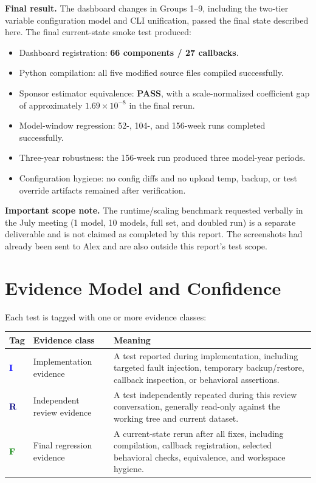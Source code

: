 \documentclass[11pt]{article}
\newcommand{\IR}{\textcolor{blue}{\textbf{I}}}
\newcommand{\RR}{\textcolor{navy}{\textbf{R}}}
\newcommand{\FR}{\textcolor{green}{\textbf{F}}}
\begin{document}
\textbf{Final result.} The dashboard changes in Groups 1--9, including the two-tier variable configuration model and CLI unification, passed the final state described here. The final current-state smoke test produced:

\begin{itemize}
  \item Dashboard registration: \textbf{66 components / 27 callbacks}.
  \item Python compilation: all five modified source files compiled successfully.
  \item Sponsor estimator equivalence: \textbf{PASS}, with a scale-normalized coefficient gap of approximately $1.69\times10^{-8}$ in the final rerun.
  \item Model-window regression: 52-, 104-, and 156-week runs completed successfully.
  \item Three-year robustness: the 156-week run produced three model-year periods.
  \item Configuration hygiene: no config diffs and no upload temp, backup, or test override artifacts remained after verification.
\end{itemize}

\textbf{Important scope note.} The runtime/scaling benchmark requested verbally in the July meeting (1 model, 10 models, full set, and doubled run) is a separate deliverable and is not claimed as completed by this report. The screenshots had already been sent to Alex and are also outside this report's test scope.

\section{Evidence Model and Confidence}

Each test is tagged with one or more evidence classes:

\begin{center}
\begin{tabular}{L{1.0cm}L{4.3cm}L{10.2cm}}
\toprule
\textbf{Tag} & \textbf{Evidence class} & \textbf{Meaning}\\
\midrule
\IR & Implementation evidence & A test reported during implementation, including targeted fault injection, temporary backup/restore, callback inspection, or behavioral assertions.\\
\RR & Independent review evidence & A test independently repeated during this review conversation, generally read-only against the working tree and current dataset.\\
\FR & Final regression evidence & A current-state rerun after all fixes, including compilation, callback registration, selected behavioral checks, equivalence, and workspace hygiene.\\
\bottomrule
\end{tabular}
\end{center}
\end{document}
